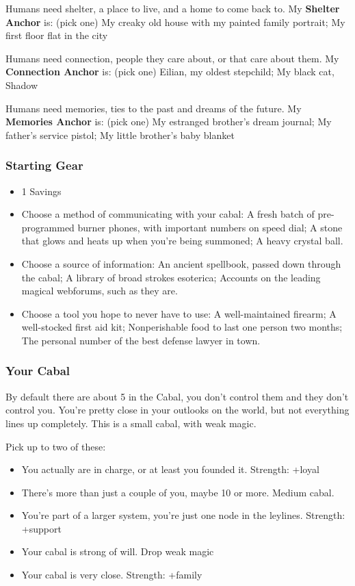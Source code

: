 \documentclass[
]{article}
\providecommand{\tightlist}{%
  \setlength{\itemsep}{0pt}\setlength{\parskip}{0pt}}
\begin{document}
Humans need shelter, a place to live, and a home to come back to. My
\textbf{Shelter Anchor} is: (pick one) My creaky old house with my
painted family portrait; My first floor flat in the city

Humans need connection, people they care about, or that care about them.
My \textbf{Connection Anchor} is: (pick one) Eilian, my oldest
stepchild; My black cat, Shadow

Humans need memories, ties to the past and dreams of the future. My
\textbf{Memories Anchor} is: (pick one) My estranged brother's dream
journal; My father's service pistol; My little brother's baby blanket

\hypertarget{starting-gear}{%
\subsubsection{Starting Gear}\label{starting-gear}}

\begin{itemize}
\tightlist
\item
  1 Savings
\item
  Choose a method of communicating with your cabal: A fresh batch of
  pre-programmed burner phones, with important numbers on speed dial; A
  stone that glows and heats up when you're being summoned; A heavy
  crystal ball.
\item
  Choose a source of information: An ancient spellbook, passed down
  through the cabal; A library of broad strokes esoterica; Accounts on
  the leading magical webforums, such as they are.
\item
  Choose a tool you hope to never have to use: A well-maintained
  firearm; A well-stocked first aid kit; Nonperishable food to last one
  person two months; The personal number of the best defense lawyer in
  town.
\end{itemize}

\hypertarget{your-cabal}{%
\subsubsection{Your Cabal}\label{your-cabal}}

By default there are about 5 in the Cabal, you don't control them and
they don't control you. You're pretty close in your outlooks on the
world, but not everything lines up completely. This is a small cabal,
with weak magic.

Pick up to two of these:

\begin{itemize}
\tightlist
\item
  You actually are in charge, or at least you founded it. Strength:
  +loyal
\item
  There's more than just a couple of you, maybe 10 or more. Medium
  cabal.
\item
  You're part of a larger system, you're just one node in the leylines.
  Strength: +support
\item
  Your cabal is strong of will. Drop weak magic
\item
  Your cabal is very close. Strength: +family
\end{itemize}
\end{document}
